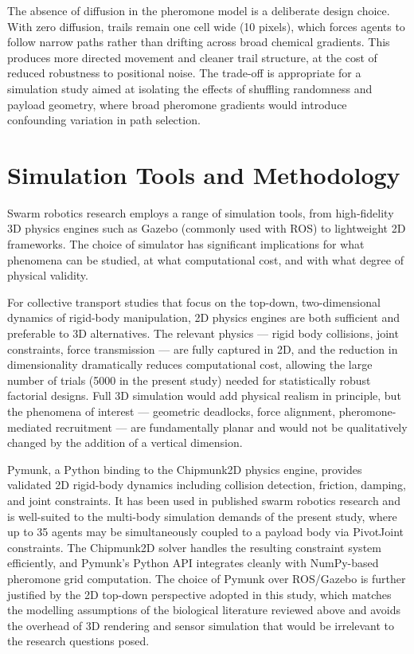 The absence of diffusion in the pheromone model is a deliberate design choice. With zero diffusion, trails remain one cell wide (10 pixels), which forces agents to follow narrow paths rather than drifting across broad chemical gradients. This produces more directed movement and cleaner trail structure, at the cost of reduced robustness to positional noise. The trade-off is appropriate for a simulation study aimed at isolating the effects of shuffling randomness and payload geometry, where broad pheromone gradients would introduce confounding variation in path selection.

\section{Simulation Tools and Methodology}
\label{sec:simulation_tools}

Swarm robotics research employs a range of simulation tools, from high-fidelity 3D physics engines such as Gazebo (commonly used with ROS) to lightweight 2D frameworks. The choice of simulator has significant implications for what phenomena can be studied, at what computational cost, and with what degree of physical validity.

For collective transport studies that focus on the top-down, two-dimensional dynamics of rigid-body manipulation, 2D physics engines are both sufficient and preferable to 3D alternatives. The relevant physics — rigid body collisions, joint constraints, force transmission — are fully captured in 2D, and the reduction in dimensionality dramatically reduces computational cost, allowing the large number of trials (5000 in the present study) needed for statistically robust factorial designs. Full 3D simulation would add physical realism in principle, but the phenomena of interest — geometric deadlocks, force alignment, pheromone-mediated recruitment — are fundamentally planar and would not be qualitatively changed by the addition of a vertical dimension.

Pymunk, a Python binding to the Chipmunk2D physics engine, provides validated 2D rigid-body dynamics including collision detection, friction, damping, and joint constraints. It has been used in published swarm robotics research and is well-suited to the multi-body simulation demands of the present study, where up to 35 agents may be simultaneously coupled to a payload body via PivotJoint constraints. The Chipmunk2D solver handles the resulting constraint system efficiently, and Pymunk's Python API integrates cleanly with NumPy-based pheromone grid computation. The choice of Pymunk over ROS/Gazebo is further justified by the 2D top-down perspective adopted in this study, which matches the modelling assumptions of the biological literature reviewed above and avoids the overhead of 3D rendering and sensor simulation that would be irrelevant to the research questions posed.
